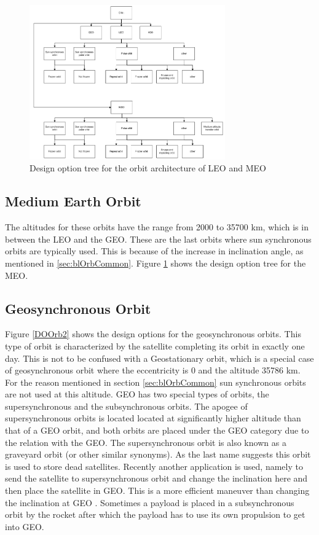 \begin{figure}
\centering
  \includegraphics[width=0.75\textwidth,angle=0]{chapters/img/blDOOrb1.jpg}
	\caption{Design option tree for the orbit architecture of LEO and MEO}
	\label{DOOrb1}
\end{figure}

\subsection{Medium Earth Orbit}
\label{sec:blOrb2}
The altitudes for these orbits have the range from 2000 to 35700 km, which is in between the \acs{LEO} and the \ac{GEO}. These are the last orbits where sun synchronous orbits are typically used. This is because of the increase in inclination angle, as mentioned in \ref{sec:blOrbCommon}. Figure \ref{DOOrb1} shows the design option tree for the \ac{MEO}.

\subsection{Geosynchronous Orbit}
\label{sec:blOrb3}
Figure \ref{DOOrb2} shows the design options for the geosynchronous orbits.
This type of orbit is characterized by the satellite completing its orbit in exactly one day. This is not to be confused with a Geostationary orbit, which is a special case of geosynchronous orbit where the eccentricity is 0 and the altitude 35786 km.
For the reason mentioned in section \ref{sec:blOrbCommon} sun synchronous orbits are not used at this altitude. \acs{GEO} has two special types of orbits, the supersynchronous and the subsynchronous orbits. 
The apogee of supersynchronous orbits is located located at significantly higher altitude than that of a \acs{GEO} orbit, and both orbits are placed under the \acs{GEO} category due to the relation with the \acs{GEO}. The supersynchronous orbit is also known as a graveyard orbit (or other similar synonyms). As the last name suggests this orbit is used to store dead satellites. Recently another application is used, namely to send the satellite to supersynchronous orbit and change the inclination here and then place the satellite in \acs{GEO}. This is a more efficient maneuver than changing the inclination at \acs{GEO} \cite{jerOrbit}. 
Sometimes a payload is placed in a subsynchronous orbit by the rocket after which the payload has to use its own propulsion to get into \acs{GEO}.

